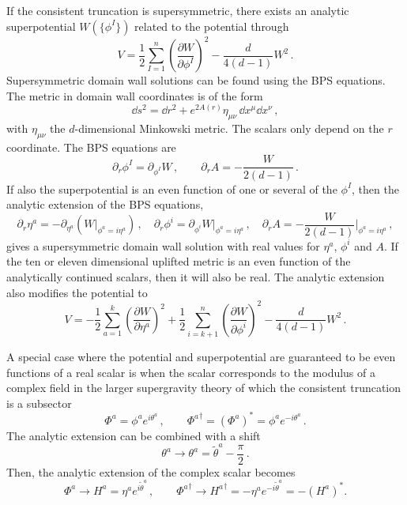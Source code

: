 If the consistent truncation is supersymmetric, there exists an analytic superpotential $W\left(\{\phi^I\}\right)$ related to the potential through
\begin{equation}
V=\frac{1}{2}\sum_{I=1}^n\left(\frac{\partial W}{\partial \phi^I}\right)^2-\frac{d}{4(d-1)}W^2\,.
\end{equation}
Supersymmetric domain wall solutions can be found using the BPS equations.
The metric in domain wall coordinates is of the form
\begin{equation}
	\label{eq:domain_wall}
	\dd s^2
	=
	\dd r^2 + e^{2A(r)}\eta_{\mu\nu}\,\dd x^\mu \dd x^\nu\,,
\end{equation}
with $\eta_{\mu\nu}$ the $d$-dimensional Minkowski metric.
The scalars only depend on the $r$ coordinate.
The BPS equations are
\begin{equation}
	\partial_r\phi^I=\partial_{\phi^I}W\,,\qquad \partial_r A= -\frac{W}{2(d-1)}\,.
\end{equation}
If also the superpotential is an even function of one or several of the $\phi^I$, then the analytic extension of the BPS equations,
\begin{equation}\label{eq:BPS}
	\partial_r \eta^a=-\partial_{\eta^a}\left( W\Big|_{\phi^a=i \eta^a}\right)\,,\quad \partial_r \phi^i =\partial_{\phi^i}W\Big|_{\phi^a=i \eta^a}\,, \quad  \partial_r A= -\frac{W}{2(d-1)}\Big|_{\phi^a=i \eta^a}\,,
\end{equation}
gives a supersymmetric domain wall solution with real values for $\eta^a$, $\phi^i$ and $A$.
If the ten or eleven dimensional uplifted metric is an even function of the analytically continued scalars, then it will also be real.
The analytic extension also modifies the potential to
\begin{equation}
\label{eq:VfromW}
V=-\frac{1}{2}\sum_{a=1}^k\left(\frac{\partial W}{\partial \eta^a}\right)^2+\frac{1}{2}\sum_{i=k+1}^n\left(\frac{\partial W}{\partial \phi^i}\right)^2-\frac{d}{4(d-1)}W^2\,.
\end{equation}

A special case where the potential and superpotential are guaranteed to be even functions of a real scalar is when the scalar corresponds to the modulus of a complex field in the larger supergravity theory of which the consistent truncation is a subsector
\begin{equation}
	\Phi^a=\phi^a e^{i\theta^a}\,,\qquad {\Phi^a}^\dagger=(\Phi^a)^*=\phi^a e^{-i\theta^a}\,.
\end{equation}
The analytic extension can be combined with a shift
\begin{equation}
	\theta^a\to \theta^a=\tilde\theta^a-\frac{\pi}{2}\,.
\end{equation}
Then, the analytic extension of the complex scalar becomes
\begin{equation}
	\Phi^a\to H^a=\eta^a e^{i\tilde\theta^a}\,,\qquad {\Phi^a}^\dagger\to {H^a}^\dagger=-\eta^a e^{-i\tilde\theta^a}=-(H^a)^*.
\end{equation}

